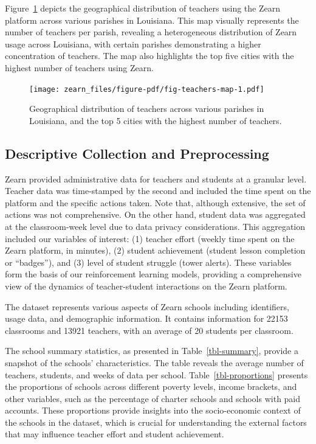\documentclass[
  number,
  preprint,
  3p,
  onecolumn]{elsarticle}
\begin{document}
Figure~\ref{fig-teachers-map} depicts the geographical distribution of
teachers using the Zearn platform across various parishes in Louisiana.
This map visually represents the number of teachers per parish,
revealing a heterogeneous distribution of Zearn usage across Louisiana,
with certain parishes demonstrating a higher concentration of teachers.
The map also highlights the top five cities with the highest number of
teachers using Zearn.

\begin{figure}

{\centering \texttt{[image: zearn\_files/figure-pdf/fig-teachers-map-1.pdf]}

}

\caption{\label{fig-teachers-map}Geographical distribution of teachers
across various parishes in Louisiana, and the top 5 cities with the
highest number of teachers.}

\end{figure}

\hypertarget{descriptive-collection-and-preprocessing}{%
\subsection{Descriptive Collection and
Preprocessing}\label{descriptive-collection-and-preprocessing}}

Zearn provided administrative data for teachers and students at a
granular level. Teacher data was time-stamped by the second and included
the time spent on the platform and the specific actions taken. Note
that, although extensive, the set of actions was not comprehensive. On
the other hand, student data was aggregated at the classroom-week level
due to data privacy considerations. This aggregation included our
variables of interest: (1) teacher effort (weekly time spent on the
Zearn platform, in minutes), (2) student achievement (student lesson
completion or ``badges''), and (3) level of student struggle (tower
alerts). These variables form the basis of our reinforcement learning
models, providing a comprehensive view of the dynamics of
teacher-student interactions on the Zearn platform.

The dataset represents various aspects of Zearn schools including
identifiers, usage data, and demographic information. It contains
information for 22153 classrooms and 13921 teachers, with an average of
20 students per classroom.

The school summary statistics, as presented in Table~\ref{tbl-summary},
provide a snapshot of the schools' characteristics. The table reveals
the average number of teachers, students, and weeks of data per school.
Table~\ref{tbl-proportions} presents the proportions of schools across
different poverty levels, income brackets, and other variables, such as
the percentage of charter schools and schools with paid accounts. These
proportions provide insights into the socio-economic context of the
schools in the dataset, which is crucial for understanding the external
factors that may influence teacher effort and student achievement.
\end{document}

